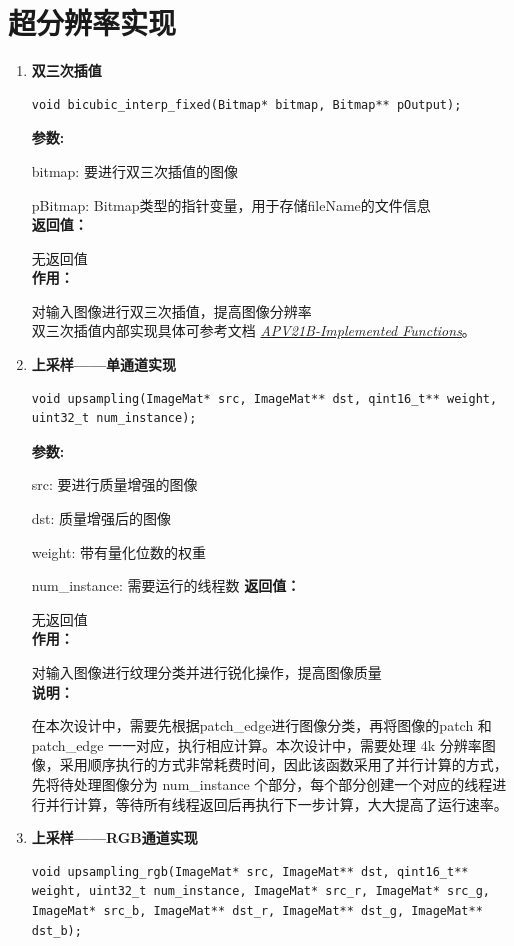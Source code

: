\documentclass[12pt, a4paper, oneside]{ctexbook}
\begin{document}
	\section{超分辨率实现}
	\begin{enumerate}
		\item \textbf{双三次插值}
		\begin{lstlisting}[numbers=none]
void bicubic_interp_fixed(Bitmap* bitmap, Bitmap** pOutput);
		\end{lstlisting}
		\textbf{参数:} \par bitmap: 要进行双三次插值的图像 \par pBitmap: Bitmap类型的指针变量，用于存储fileName的文件信息 \\
		\textbf{返回值：}\par 无返回值\\
		\textbf{作用：}\par 对输入图像进行双三次插值，提高图像分辨率\\
		双三次插值内部实现具体可参考文档 \href{./ref/APV21B_Implemented_Functions.pdf}{\textit{APV21B-Implemented Functions}}。
	
	\item \textbf{上采样——单通道实现}
		\begin{lstlisting}[numbers=none]
void upsampling(ImageMat* src, ImageMat** dst, qint16_t** weight, uint32_t num_instance);			
		\end{lstlisting}
		\textbf{参数:} \par src: 要进行质量增强的图像 \par dst: 质量增强后的图像\par weight: 带有量化位数的权重\par num\_instance: 需要运行的线程数
		\textbf{返回值：}\par 无返回值\\
		\textbf{作用：}\par 对输入图像进行纹理分类并进行锐化操作，提高图像质量\\
		\textbf{说明：}\par 在本次设计中，需要先根据patch\_edge进行图像分类，再将图像的patch 和 patch\_edge 一一对应，执行相应计算。本次设计中，需要处理 4k 分辨率图像，采用顺序执行的方式非常耗费时间，因此该函数采用了并行计算的方式，先将待处理图像分为 num\_instance 个部分，每个部分创建一个对应的线程进行并行计算，等待所有线程返回后再执行下一步计算，大大提高了运行速率。
		
		\item \textbf{上采样——RGB通道实现}
			\begin{lstlisting}[numbers=none]
void upsampling_rgb(ImageMat* src, ImageMat** dst, qint16_t** weight, uint32_t num_instance, ImageMat* src_r, ImageMat* src_g, ImageMat* src_b, ImageMat** dst_r, ImageMat** dst_g, ImageMat** dst_b);
			\end{lstlisting}
	

\end{enumerate}
\end{document}
